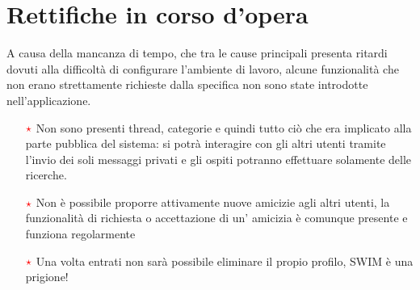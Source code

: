 \documentclass[a4paper,12pt]{article}
\begin{document}
\section{Rettifiche in corso d'opera}
A causa della mancanza di tempo, che tra le cause principali presenta ritardi dovuti alla difficoltà di configurare l'ambiente di lavoro, alcune funzionalità che non erano strettamente richieste dalla specifica non sono state introdotte nell'applicazione.
\begin{itemize}
\item [$\textcolor{red}{\star}$]Non sono presenti thread, categorie e quindi tutto ciò che era implicato alla parte pubblica del sistema: si potrà interagire con gli altri utenti tramite l'invio dei soli messaggi privati e gli ospiti potranno effettuare solamente delle ricerche.

\item[$\textcolor{red}{\star}$]Non è possibile proporre attivamente nuove amicizie agli altri utenti, la funzionalità di richiesta o accettazione di un' amicizia è comunque presente e funziona regolarmente

\item[$\textcolor{red}{\star}$]Una volta entrati non sarà possibile eliminare il propio profilo, SWIM è una prigione!
\end{itemize}
\end{document}
